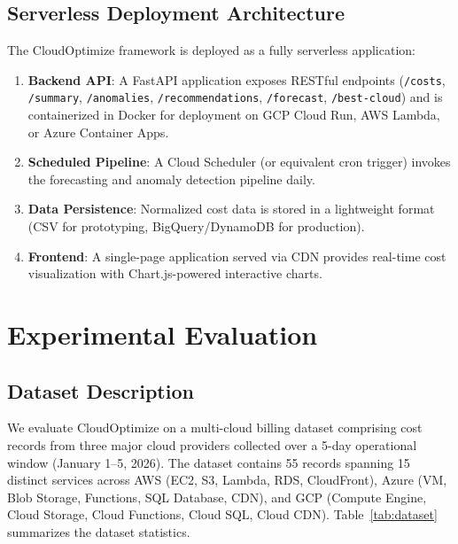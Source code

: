 \documentclass[conference]{IEEEtran}
\begin{document}
\subsection{Serverless Deployment Architecture}

The CloudOptimize framework is deployed as a fully serverless application:

\begin{enumerate}
    \item \textbf{Backend API}: A FastAPI application exposes RESTful endpoints (\texttt{/costs}, \texttt{/summary}, \texttt{/anomalies}, \texttt{/recommendations}, \texttt{/forecast}, \texttt{/best-cloud}) and is containerized in Docker for deployment on GCP Cloud Run, AWS Lambda, or Azure Container Apps.
    \item \textbf{Scheduled Pipeline}: A Cloud Scheduler (or equivalent cron trigger) invokes the forecasting and anomaly detection pipeline daily.
    \item \textbf{Data Persistence}: Normalized cost data is stored in a lightweight format (CSV for prototyping, BigQuery/DynamoDB for production).
    \item \textbf{Frontend}: A single-page application served via CDN provides real-time cost visualization with Chart.js-powered interactive charts.
\end{enumerate}

\section{Experimental Evaluation}
\label{sec:results}

\subsection{Dataset Description}

We evaluate CloudOptimize on a multi-cloud billing dataset comprising cost records from three major cloud providers collected over a 5-day operational window (January 1--5, 2026). The dataset contains 55 records spanning 15 distinct services across AWS (EC2, S3, Lambda, RDS, CloudFront), Azure (VM, Blob Storage, Functions, SQL Database, CDN), and GCP (Compute Engine, Cloud Storage, Cloud Functions, Cloud SQL, Cloud CDN). Table~\ref{tab:dataset} summarizes the dataset statistics.
\end{document}
